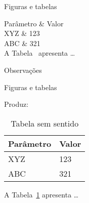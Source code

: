 \begin{frame}{Figuras e tabelas}
\fontsize{10}{11}\selectfont

\begin{LaTeXcode}[Exemplo]
\Lopt[!tp] \n
{} 
 \n
{} \n
{} \string\hline \n
Parâmetro \& Valor \string\\ \string\hline\string\hline \n
XYZ \& 123 \string\\ \n
ABC \& 321 \string\\ \string\hline \n
{} \n
{} \n
A Tabela\string~ apresenta \string\dots
\end{LaTeXcode}

\begin{block}{Observações}
\end{block}
\end{frame}

\begin{frame}{Figuras e tabelas}
\fontsize{10}{11}\selectfont

Produz:

\begin{LaTeXoutput}
\begin{table}
\caption{Tabela sem sentido}%
\label{tab:semsentido}
\centering
\begin{tabular}{l|l} \hline
Parâmetro & Valor \\ \hline\hline
XYZ & 123 \\
ABC & 321 \\ \hline
\end{tabular}
\end{table}
A Tabela~\ref{tab:semsentido} apresenta \ldots
\end{LaTeXoutput}
\end{frame}

